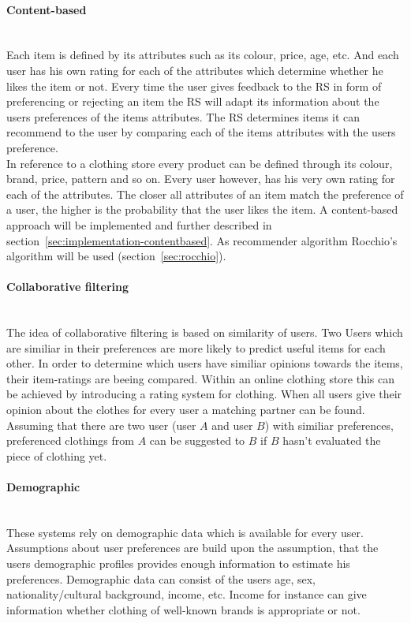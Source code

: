 \paragraph{Content-based}~\\
Each item is defined by its attributes such as its colour, price, age, etc.
And each user has his own rating for each of the attributes which determine whether he likes the item or not.
Every time the user gives feedback to the RS in form of preferencing or rejecting an item the RS will adapt its information about the users preferences of the items attributes.
The RS determines items it can recommend to the user by comparing each of the items attributes with the users preference.
\citep[p.~75]{lops:2011}\\
In reference to a clothing store every product can be defined through its colour, brand, price, pattern and so on.
Every user however, has his very own rating for each of the attributes.
The closer all attributes of an item match the preference of a user, the higher is the probability that the user likes the item.
A content-based approach will be implemented and further described in section~\ref{sec:implementation-contentbased}.
As recommender algorithm Rocchio's algorithm will be used (section~\ref{sec:rocchio}).

\paragraph{Collaborative filtering}~\\
The idea of collaborative filtering is based on similarity of users.
Two Users which are similiar in their preferences are more likely to predict useful items for each other.
In order to determine which users have similiar opinions towards the items, their item-ratings are beeing compared.
\citep[p.~291-292]{schafer:2007}
Within an online clothing store this can be achieved by introducing a rating system for clothing.
When all users give their opinion about the clothes for every user a matching partner can be found.
Assuming that there are two user (user $A$ and user $B$) with similiar preferences, preferenced clothings from $A$ can be suggested to $B$ if $B$ hasn't evaluated the piece of clothing yet.

\paragraph{Demographic}~\\
These systems rely on demographic data which is available for every user.
Assumptions about user preferences are build upon the assumption, that the users demographic profiles provides enough information to estimate his preferences.
Demographic data can consist of the users age, sex, nationality/cultural background, income, etc.\citep[p.~12]{ricci:2011}
Income for instance can give information whether clothing of well-known brands is appropriate or not.


